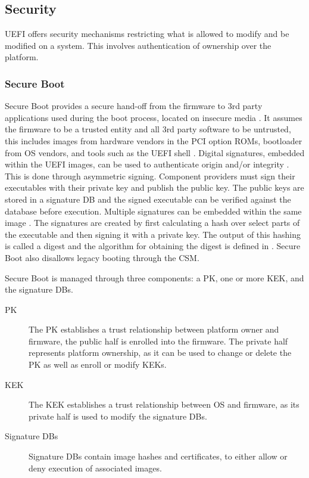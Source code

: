 
\subsection{Security}

\ac{UEFI} offers security mechanisms restricting what is allowed to modify and be modified on a system.
This involves authentication of ownership over the platform.

\subsubsection{Secure Boot}
\label{sec:uefi-pi:uefi:secure-boot}

Secure Boot provides a secure hand-off from the firmware to 3rd party applications used during the boot process, located on insecure media \cite{tianocore-understanding-uefi-secure-boot-chain} \cite[Sections 32.2 and 32.5.1]{uefi-spec}.
It assumes the firmware to be a trusted entity and all 3rd party software to be untrusted, this includes images from hardware vendors in the \ac{PCI} option \acp{ROM}, bootloader from \ac{OS} vendors, and tools such as the \ac{UEFI} shell \cite{tianocore-understanding-uefi-secure-boot-chain}.
Digital signatures, embedded within the \ac{UEFI} images, can be used to authenticate origin and/or integrity \cite[Section 32.2]{uefi-spec}.
This is done through asymmetric signing. Component providers must sign their executables with their private key and publish the public key.
The public keys are stored in a signature \ac{DB} and the signed executable can be verified against the database before execution.
Multiple signatures can be embedded within the same image \cite[Section 32.2.2]{uefi-spec}.
The signatures are created by first calculating a hash over select parts of the executable and then signing it with a private key.
The output of this hashing is called a digest and the algorithm for obtaining the digest is defined in \cite{microsoft-pe-signature-format}.
Secure Boot also disallows legacy booting through the \ac{CSM}.

Secure Boot is managed through three components: a \ac{PK}, one or more \ac{KEK}, and the signature \acp{DB}.

\begin{description}
    \item[\acf{PK}]
        The \ac{PK} establishes a trust relationship between platform owner and firmware, the public half is enrolled into the firmware.
        The private half represents platform ownership, as it can be used to change or delete the \ac{PK} as well as enroll or modify \acp{KEK}.
    \item[\acf{KEK}]
        The \ac{KEK} establishes a trust relationship between \ac{OS} and firmware, as its private half is used to modify the signature \acp{DB}.
    \item[Signature \acfp{DB}]
        Signature \acp{DB} contain image hashes and certificates, to either allow or deny execution of associated images.
\end{description}


